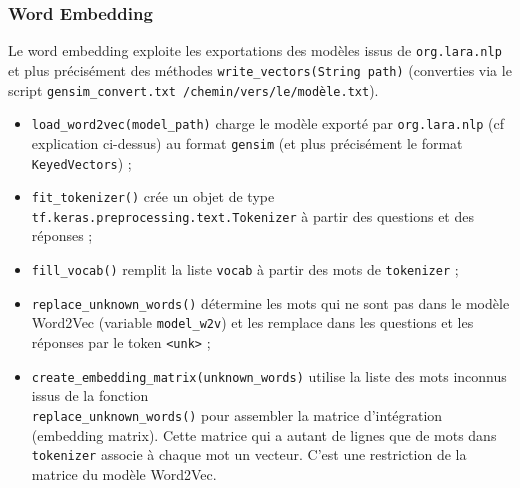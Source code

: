 \documentclass[10pt,a4paper]{article}
\begin{document}
\subsubsection{Word Embedding}
Le word embedding exploite les exportations des modèles issus de \texttt{org.lara.nlp} et plus précisément des méthodes \texttt{write\_vectors(String path)} (converties via le script \texttt{gensim\_convert.txt /chemin/vers/le/modèle.txt}).
\begin{itemize}
\item \texttt{load\_word2vec(model\_path)} charge le modèle exporté par \texttt{org.lara.nlp} (cf explication ci-dessus) au format \texttt{gensim} (et plus précisément le format \texttt{KeyedVectors}) ;
\item \texttt{fit\_tokenizer()} crée un objet de type \texttt{tf.keras.preprocessing.text.Tokenizer} à partir des questions et des réponses ;
\item \texttt{fill\_vocab()} remplit la liste \texttt{vocab} à partir des mots de \texttt{tokenizer} ;
\item \texttt{replace\_unknown\_words()} détermine les mots qui ne sont pas dans le modèle Word2Vec (variable \texttt{model\_w2v}) et les remplace dans les questions et les réponses par le token \texttt{<unk>} ;
\item \texttt{create\_embedding\_matrix(unknown\_words)} utilise la liste des mots inconnus issus de la fonction \\ \texttt{replace\_unknown\_words()} pour assembler la matrice d'intégration (embedding matrix). Cette matrice qui a autant de lignes que de mots dans \texttt{tokenizer} associe à chaque mot un vecteur. C'est une restriction de la matrice du modèle Word2Vec.
\end{itemize}
\end{document}
